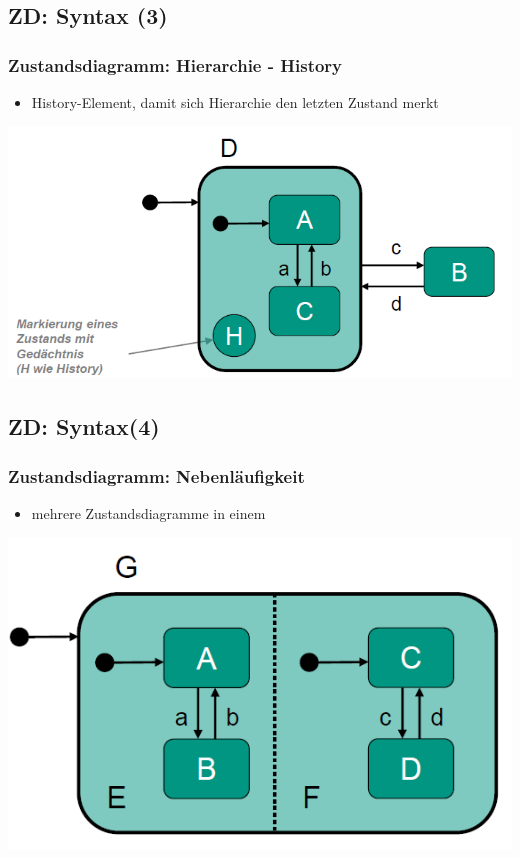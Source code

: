 \documentclass[18pt]{beamer}
\begin{document}
	\subsection{ZD: Syntax (3)}
	\begin{frame}
		\frametitle{Zustandsdiagramm: Hierarchie - History}
		\begin{itemize}
			\item  History-Element, damit sich Hierarchie den letzten Zustand merkt
		\end{itemize}
		\includegraphics[scale=0.5]{./pics/tut2/auto_hier-hist.png}	
	\end{frame}

	\subsection{ZD: Syntax(4)}
	\begin{frame}
		\frametitle{Zustandsdiagramm: Nebenläufigkeit}	
		\begin{itemize}
			\item  mehrere Zustandsdiagramme in einem
		\end{itemize}
		\centering
		\includegraphics[scale=0.5]{./pics/tut2/auto_par.png}	
	\end{frame}
\end{document}
